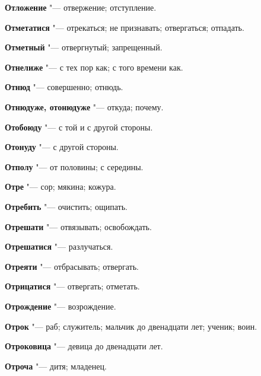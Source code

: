 \begin{mymulticols}{2}
\noindent\textbf{Отложение} "--- отвержение; отступление. 




\noindent\textbf{Отметатися} "--- отрекаться; не признавать; отвергаться; отпадать. 




\noindent\textbf{Отметный} "--- отвергнутый; запрещенный. 




\noindent\textbf{Отнелиже} "--- с тех пор как; с того времени как. 




\noindent\textbf{Отнюд} "--- совершенно; отнюдь. 




\noindent\textbf{Отнюдуже, отонюдуже} "--- откуда; почему. 




\noindent\textbf{Отобоюду} "--- с той и с другой стороны. 




\noindent\textbf{Отонуду} "--- с другой стороны. 




\noindent\textbf{Отполу} "--- от половины; с середины. 




\noindent\textbf{Отре} "--- сор; мякина; кожура. 




\noindent\textbf{Отребить} "--- очистить; ощипать. 




\noindent\textbf{Отрешати} "--- отвязывать; освобождать. 




\noindent\textbf{Отрешатися} "--- разлучаться. 




\noindent\textbf{Отреяти} "--- отбрасывать; отвергать. 




\noindent\textbf{Отрицатися} "--- отвергать; отметать. 




\noindent\textbf{Отрождение} "--- возрождение. 




\noindent\textbf{Отрок} "--- раб; служитель; мальчик до двенадцати лет; ученик; воин. 




\noindent\textbf{Отроковица} "--- девица до двенадцати лет. 




\noindent\textbf{Отроча} "--- дитя; младенец. 





\end{mymulticols}
